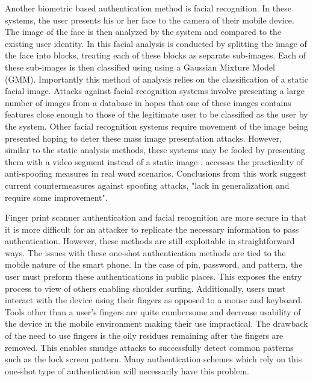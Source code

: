 Another biometric based authentication method
is facial recognition.
In these systems,
the user presents his or her face to the camera
of their mobile device.
%
The image of the face is then 
analyzed by the system and compared to the existing user identity.
%
In \cite{mccool2009parts} this facial analysis
is conducted by 
splitting the image of the face into blocks,
treating each of these blocks as separate sub-images.
Each of these sub-images is then classified using
using a Gaussian Mixture Model (GMM).
%
Importantly this method of analysis relies on
the classification of a static facial image.
%
Attacks against facial recognition systems
involve presenting a large number of images from a database
in hopes that one of these images contains
features close enough to those of the legitimate user
to be classified as the user by the system.
%
Other facial recognition systems require movement of
the image being presented
hoping to deter these mass image presentation attacks.
%
However, similar to the static analysis methods,
these systems may be fooled by
presenting them with a video segment
instead of a static image \cite{hadid2014face}. 
%
\cite{de2013can}
accesses the practicality of 
anti-spoofing measures in real word scenarios.
Conclusions from this work suggest
current countermeasures against spoofing attacks,
"lack in generalization and require some improvement".

Finger print scanner authentication and
facial recognition are more secure in 
that it is more difficult for an attacker to replicate
the necessary information to pass authentication.
%
However,
these methods are still exploitable in straightforward ways.
%
The issues with these one-shot authentication methods
are tied to the mobile nature of the smart phone.
%
In the case of pin, password, and pattern,
the user must preform these authentications in 
public places.
This exposes the entry process to view of others
enabling shoulder surfing.
%
Additionally,
users must interact with the device using their
fingers as opposed to a mouse and keyboard.
%
Tools other than a user's fingers are quite cumbersome
and decrease usability of the device in the mobile environment
making their use impractical.
%
The drawback of the need to use fingers
is the oily residues remaining after the fingers are removed.
This enables smudge attacks to successfully detect
common patterns such as the lock screen pattern.
%
Many authentication schemes which rely on this one-shot
type of authentication will necessarily have this problem.

